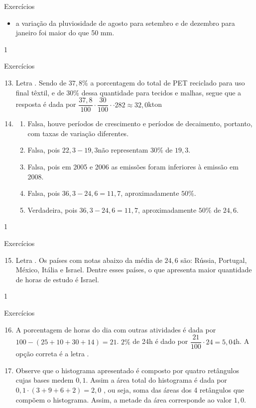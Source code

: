 {\begin{answer}{Exercícios}
{\begin{enumerate}
\begin{itemize}
  \item a variação da pluviosidade de agosto para setembro e de dezembro para janeiro foi maior do que 50 mm.
  \end{itemize}
  \end{enumerate}
}{1}
\end{answer}
\clearmargin
\begin{answer}{Exercícios}
{\exerciselist
  \begin{enumerate}\setcounter{enumi}{12}
  \item Letra . Sendo de $37{,}8\%$ a porcentagem do total de PET reciclado para uso final têxtil, e de $30\%$ dessa quantidade para tecidos e malhas, segue que a resposta é dada por $\dfrac{37{,}8}{100}\cdot\dfrac{30}{100}\cdot⋅282\approx32{,}0$kton
  \item
  \begin{enumerate}
  \item Falsa, houve períodos de crescimento e períodos de decaimento, portanto, com taxas de variação diferentes. 
  \item Falsa, pois $22{,}3-19{,}3 $não representam $30\%$ de $19{,}3$.
  \item Falsa, pois em 2005 e 2006 as emissões foram inferiores à emissão em 2008.
  \item Falsa, pois $36{,}3-24{,}6=11{,}7$, aproximadamente $50\%$.
  \item Verdadeira, pois $36{,}3-24{,}6=11{,}7$, aproximadamente $50\%$ de $24{,}6$.
  \end{enumerate}
  \end{enumerate}
}{1}
\end{answer}
\clearmargin
\begin{answer}{Exercícios}
{\exerciselist
  \begin{enumerate}\setcounter{enumi}{14}
  \item Letra . Os países com notas abaixo da média de $24{,}6$ são: Rússia, Portugal, México, Itália e Israel. Dentre esses países, o que apresenta maior quantidade de horas de estudo é Israel.
  \end{enumerate}
}{1}
\end{answer}
\clearmargin
\begin{answer}{Exercícios}
{\exerciselist
  \begin{enumerate}\setcounter{enumi}{15}
  \item A porcentagem de horas do dia com outras atividades é dada por $100-(25+10+30+14)=21$. $2\%$ de 24h é dado por $\dfrac{21}{100}\cdot24=5{,}04$h. A opção correta é a letra .
  \item Observe que o histograma apresentado é composto por quatro retângulos cujas bases medem $0{,}1$. Assim a área total do histograma é dada por $0{,}1\cdot(3+9+6+2)=2,0$ , ou seja, soma das áreas dos 4 retângulos que compõem o histograma. Assim, a metade da área corresponde ao valor $1{,}0$.


\end{enumerate}}
\end{answer}}

